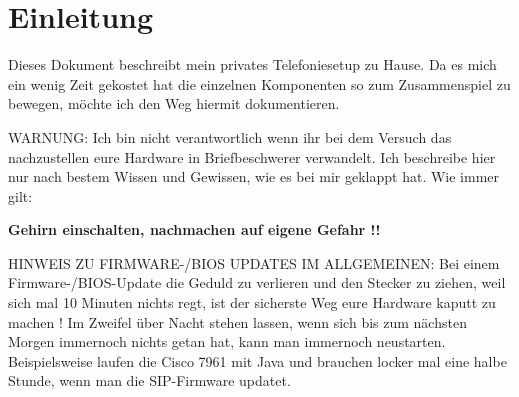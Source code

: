 \documentclass[a4paper,12pt]{scrbook}
\begin{document}
\clearpage
 
\onehalfspacing
 
 \renewcommand{\figurename}{Abb.}



\pagestyle{fancy}

\pagestyle{fancy} 
\fancyhf{}  %
\renewcommand{\headrulewidth}{1pt} 
\fancyhead[EL]{\nouppercase{\leftmark}} %
\fancyhead[OR]{\nouppercase{\leftmark}} %
\fancyfoot[EL]{\thepage} %
\fancyfoot[OR]{\thepage} %



\clearpage
\chapter{Einleitung}
\label{sec:0}
Dieses Dokument beschreibt mein privates Telefoniesetup zu Hause. Da es mich ein wenig Zeit gekostet hat die einzelnen Komponenten
so zum Zusammenspiel zu bewegen, möchte ich den Weg hiermit dokumentieren.

WARNUNG: Ich bin nicht verantwortlich wenn ihr bei dem Versuch das nachzustellen eure Hardware in Briefbeschwerer verwandelt. Ich
beschreibe hier nur nach bestem Wissen und Gewissen, wie es bei mir geklappt hat. Wie immer gilt: 


\textbf{Gehirn einschalten, nachmachen auf eigene Gefahr !!}


HINWEIS ZU FIRMWARE-/BIOS UPDATES IM ALLGEMEINEN: Bei einem Firmware-/BIOS-Update die Geduld zu verlieren und den Stecker zu ziehen,
weil sich mal 10 Minuten nichts regt, ist der sicherste Weg eure Hardware kaputt zu machen ! Im Zweifel über Nacht stehen lassen, wenn
sich bis zum nächsten Morgen immernoch nichts getan hat, kann man immernoch neustarten. Beispielsweise laufen die Cisco 7961 mit Java und
brauchen locker mal eine halbe Stunde, wenn man die SIP-Firmware updatet. 
\end{document}
